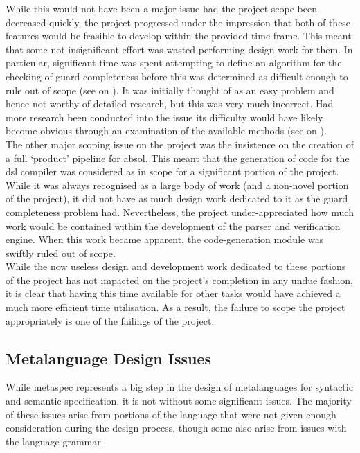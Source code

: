 While this would not have been a major issue had the project scope been decreased quickly, the project progressed under the impression that both of these features would be feasible to develop within the provided time frame.
This meant that some not insignificant effort was wasted performing design work for them. 
In particular, significant time was spent attempting to define an algorithm for the checking of guard completeness before this was determined as difficult enough to rule out of scope (see  on ).
It was initially thought of as an easy problem and hence not worthy of detailed research, but this was very much incorrect. 
Had more research been conducted into the issue its difficulty would have likely become obvious through an examination of the available methods (see  on ).\\

The other major scoping issue on the project was the insistence on the creation of a full `product' pipeline for \gls{absol}.
This meant that the generation of code for the \gls{dsl} compiler was considered as in scope for a significant portion of the project.
While it was always recognised as a large body of work (and a non-novel portion of the project), it did not have as much design work dedicated to it as the guard completeness problem had.
Nevertheless, the project under-appreciated how much work would be contained within the development of the parser and verification engine.
When this work became apparent, the code-generation module was swiftly ruled out of scope. \\

While the now useless design and development work dedicated to these portions of the project has not impacted on the project's completion in any undue fashion, it is clear that having this time available for other tasks would have achieved a much more efficient time utilisation.
As a result, the failure to scope the project appropriately is one of the failings of the project.


\subsection{Metalanguage Design Issues} %
\label{sub:metalanguage_design_issues}
While \gls{metaspec} represents a big step in the design of metalanguages for syntactic and semantic specification, it is not without some significant issues.
The majority of these issues arise from portions of the language that were not given enough consideration during the design process, though some also arise from issues with the language grammar. 

